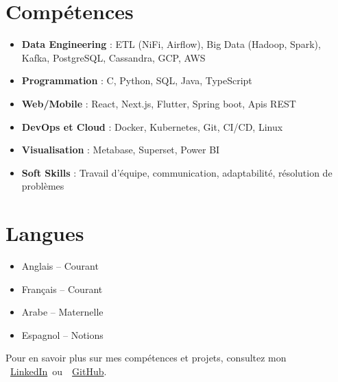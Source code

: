 \documentclass[10pt,a4paper,sans]{moderncv}
\begin{document}
\section{\fontsize{11}{12.1}\selectfont Compétences}
\vspace{-6pt}
\begin{itemize}[leftmargin=0.3cm, itemsep=-2pt, topsep=0pt, partopsep=0pt, parsep=0pt]
  \item \textbf{Data Engineering} : ETL (NiFi, Airflow), Big Data (Hadoop, Spark), Kafka, PostgreSQL, Cassandra, GCP, AWS
  \item \textbf{Programmation} : C, Python, SQL, Java, TypeScript
  \item \textbf{Web/Mobile} : React, Next.js, Flutter, Spring boot, Apis REST
  \item \textbf{DevOps et Cloud} : Docker, Kubernetes, Git, CI/CD, Linux
  \item \textbf{Visualisation} : Metabase, Superset, Power BI
  \item \textbf{Soft Skills} : Travail d’équipe, communication, adaptabilité, résolution de problèmes
\end{itemize}

\vspace{-17pt}
\section{\fontsize{11}{12.1}\selectfont Langues}
\vspace{-16pt}
\begin{multicols}{2}
\begin{itemize}[leftmargin=0.3cm, itemsep=-2pt, topsep=0pt, partopsep=0pt, parsep=0pt]
    \item Anglais – Courant
    \item Français – Courant
    \item Arabe – Maternelle
    \item Espagnol – Notions
\end{itemize}
\end{multicols}


\vspace{-21pt}
\begin{center}
    {\fontsize{9}{11}\selectfont\color{gray}
    Pour en savoir plus sur mes compétences et projets, consultez mon~
    \faLinkedin~\href{https://www.linkedin.com/in/ahmed-makroum/}{LinkedIn}~ou~\faGithub~\href{https://github.com/ahmedmakroum}{GitHub}.}
\end{center}
\end{document}
